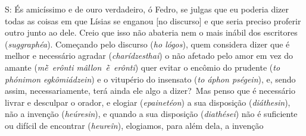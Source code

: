 \bekker{[235e]} S: És amicíssimo e de ouro verdadeiro, ó Fedro, se julgas que
eu poderia dizer todas as coisas em que Lísias se enganou [no
discurso] e que seria preciso proferir outro junto ao dele. Creio que
isso não abateria nem o mais inábil dos escritores (\emph{suggraphéa}).
Começando pelo discurso (\emph{ho lógos}), quem considera dizer que é
melhor e necessário agradar (\emph{charídzesthai}) o não afetado pelo
amor em vez do amante (\emph{mḕ~erônti mâllon~ḕ~erônti}) \bekker{[236a]} quer
evitar o encômio do prudente (\emph{to phónimon egkômiádzein}) e o
vitupério do insensato (\emph{to áphon pségein}), e, sendo assim,
necessariamente, terá ainda ele algo a dizer?~Mas penso que é necessário
livrar e desculpar o orador, e elogiar (\emph{epainetéon}) a sua
disposição (\emph{diáthesin}), não a invenção (\emph{heúresin}), e
quando a sua disposição (\emph{diathései}) não é suficiente ou difícil
de encontrar (\emph{heureîn}), elogiamos, para além dela, a invenção
